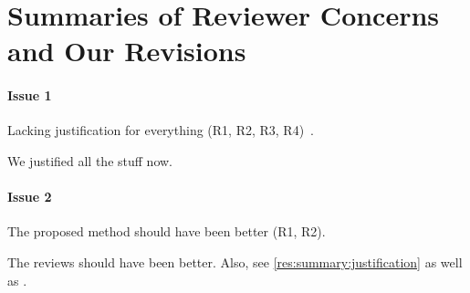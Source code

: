
\section{Summaries of Reviewer Concerns and Our Revisions} \label{sec:summary}

\paragraph{Issue 1}
Lacking justification for everything (R1, R2, R3, R4)~\cite{na2021predicting}. 

\begin{response} \label{res:summary:justification}
We justified all the stuff now.
\end{response}


\paragraph{Issue 2}
The proposed method should have been better (R1, R2).

\begin{response} \label{res:summary:better}
The reviews should have been better. Also, see \autoref{res:summary:justification} as well as .
\end{response}

